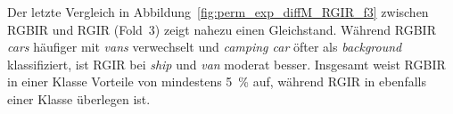 %     

Der letzte Vergleich in Abbildung~\ref{fig:perm_exp_diffM_RGIR_f3} zwischen RGBIR und RGIR (Fold~3) zeigt nahezu einen Gleichstand. Während RGBIR \textit{cars} häufiger mit \textit{vans} verwechselt und \textit{camping car} öfter als \textit{background} klassifiziert, ist RGIR bei \textit{ship} und \textit{van} moderat besser. Insgesamt weist RGBIR in einer Klasse Vorteile von mindestens 5~\% auf, während RGIR in ebenfalls einer Klasse überlegen ist.

